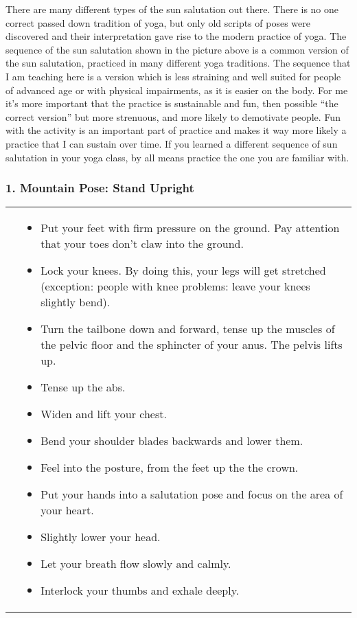 \documentclass[../Book.Stress_regulation.tex]{subfiles}
\begin{document}
There are many different types of the sun salutation out there.
There is no one correct passed down tradition of yoga, but only old scripts of poses were discovered and their interpretation gave rise to the modern practice of yoga.
The sequence of the sun salutation shown in the picture above is a common version of the sun salutation, practiced in many different yoga traditions.
The sequence that I am teaching here is a version which is less straining and well suited for people of advanced age or with physical impairments, as it is easier on the body\cite{VidyaYoga}.
For me it's more important that the practice is sustainable and fun, then possible ``the correct version'' but more strenuous, and more likely to demotivate people.
Fun with the activity is an important part of practice and makes it way more likely a practice that I can sustain over time.
If you learned a different sequence of sun salutation in your yoga class, by all means  practice the one you are familiar with.

\newpage

\subsubsection{1. Mountain Pose: Stand Upright}

\begin{tabular}{p{1.4cm} p{10.1cm}}
  \raisebox{-1.1\totalheight}{\texttt{[image: SS\_Mountain]}} &                                                                     
\begin{itemize}
\item Put your feet with firm pressure on the ground. Pay attention that your toes don't claw into the ground.
\item Lock your knees. By doing this, your legs will get stretched (exception: people with knee problems: leave your knees slightly bend).
\item Turn the tailbone down and forward, tense up the muscles of the pelvic floor and the sphincter of your anus. The pelvis lifts up.
\item Tense up the abs.
\item Widen and lift your chest.
\item Bend your shoulder blades backwards and lower them.
\item Feel into the posture, from the feet up the the crown.
\item Put your hands into a salutation pose and focus on the area of your heart.
\item Slightly lower your head.
\item Let your breath flow slowly and calmly.
\item Interlock your thumbs and exhale deeply.
\end{itemize}
  
\end{tabular}
\end{document}
